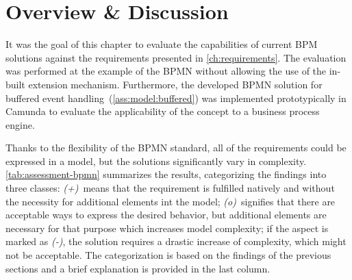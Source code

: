 \section{Overview \& Discussion}\label{ch:ass:discussion}
It was the goal of this chapter to evaluate the capabilities of current \acs{BPM} solutions against the requirements presented in \autoref{ch:requirements}.
The evaluation was performed at the example of the \acs{BPMN} without allowing the use of the in-built extension mechanism. Furthermore, the developed BPMN solution for buffered event handling~(\autoref{ass:model:buffered}) was implemented prototypically in Camunda to evaluate the applicability of the concept to a business process engine. %

Thanks to the flexibility of the BPMN standard, all of the requirements could be expressed in a model, but the solutions significantly vary in complexity.
\autoref{tab:assessment-bpmn} summarizes the results, categorizing the findings into three classes: 
\textit{(+)}~means that the requirement is fulfilled natively and without the necessity for additional elements int the model; 
\textit{(o)}~signifies that there are acceptable ways to express the desired behavior, but additional elements are necessary for that purpose which increases model complexity; 
if the aspect is marked as \textit{(-)}, the solution requires a drastic increase of complexity, which might not be acceptable.
The categorization is based on the findings of the previous sections and a brief explanation is provided in the last column.


